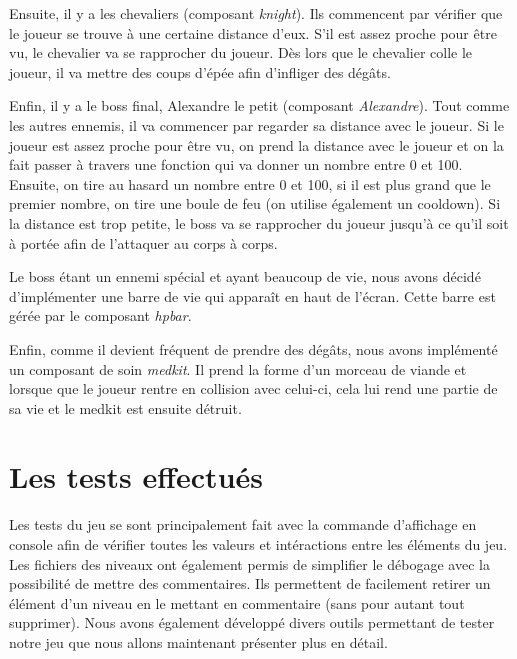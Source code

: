 \documentclass{article}
\begin{document}
Ensuite, il y a les chevaliers (composant \textit{knight}). Ils commencent par 
vérifier que le joueur se trouve à une certaine distance d'eux. S'il est assez proche pour être vu, le chevalier va se rapprocher 
du joueur. Dès lors que le chevalier colle le joueur, il va mettre des coups d'épée afin d'infliger des dégâts.

Enfin, il y a le boss final, Alexandre le petit (composant \textit{Alexandre}). Tout comme les autres ennemis, 
il va commencer par regarder sa distance avec le joueur. Si le joueur est assez proche pour être vu, on prend 
la distance avec le joueur et on la fait passer à travers une fonction qui va donner un nombre entre 0 et 100. 
Ensuite, on tire au hasard un nombre entre 0 et 100, si il est plus grand que le premier nombre, on tire une boule de feu 
(on utilise également un cooldown). Si la distance est trop petite, le boss va se rapprocher du joueur jusqu'à 
ce qu'il soit à portée afin de l'attaquer au corps à corps.

Le boss étant un ennemi spécial et ayant beaucoup de vie, nous avons décidé d'implémenter une barre de vie qui 
apparaît en haut de l'écran. Cette barre est gérée par le composant \textit{hpbar}.

Enfin, comme il devient fréquent de prendre des dégâts, nous avons implémenté un composant de soin \textit{medkit}.
Il prend la forme d'un morceau de viande et lorsque que le joueur rentre en collision avec celui-ci, cela lui rend une 
partie de sa vie et le medkit est ensuite détruit.

\section{Les tests effectués}

Les tests du jeu se sont principalement fait avec la commande d'affichage en console afin de vérifier 
toutes les valeurs et intéractions entre les éléments du jeu. Les fichiers des niveaux ont également 
permis de simplifier le débogage avec la possibilité de mettre des commentaires. Ils permettent de 
facilement retirer un élément d'un niveau en le mettant en commentaire (sans pour autant tout supprimer).
Nous avons également développé divers outils permettant de tester notre jeu que nous allons maintenant 
présenter plus en détail. 
\end{document}
